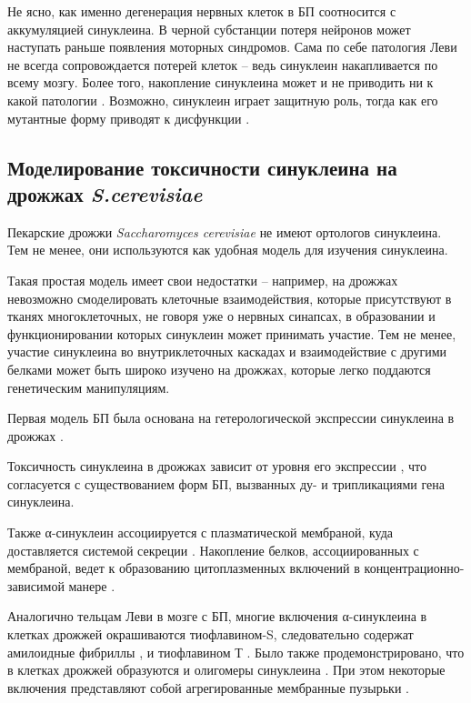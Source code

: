 Не ясно, как именно дегенерация нервных клеток в БП соотносится с аккумуляцией синуклеина.  
В черной субстанции потеря нейронов может наступать раньше появления моторных синдромов. Сама по себе патология Леви не всегда сопровождается потерей клеток -- ведь синуклеин накапливается по всему мозгу. Более того, накопление синуклеина может и не приводить ни к какой патологии \cite{markesbery_lewy_2009}. Возможно, синуклеин играет защитную роль, тогда как его мутантные форму приводят к дисфункции \cite{bendor_function_2013}.



\subsection{Моделирование токсичности синуклеина на дрожжах \emph{S.cerevisiae}}

Пекарские дрожжи \emph{Saccharomyces cerevisiae} не имеют ортологов синуклеина. Тем не менее, они используются как удобная модель для изучения синуклеина.

Такая простая модель имеет свои недостатки -- например, на дрожжах невозможно смоделировать клеточные взаимодействия, которые присутствуют в тканях многоклеточных, не говоря уже о нервных синапсах, в образовании и функционировании которых синуклеин может принимать участие. Тем не менее, участие синуклеина во внутриклеточных каскадах и взаимодействие с другими белками может быть широко изучено на дрожжах, которые легко поддаются генетическим манипуляциям.

Первая модель БП была основана на гетерологической экспрессии синуклеина в дрожжах \cite{outeiro_yeast_2003}.

Токсичность синуклеина в дрожжах зависит от уровня его экспрессии \cite{outeiro_yeast_2003}, что согласуется с существованием форм БП, вызванных ду- и трипликациями гена синуклеина.

Также α-синуклеин ассоциируется с плазматической мембраной, куда доставляется системой секреции \cite{dixon_-synuclein_2005}. Накопление белков, ассоциированных с мембраной, ведет к образованию цитоплазменных включений в концентрационно-зависимой манере \cite{dixon_-synuclein_2005}. 

Аналогично тельцам Леви в мозге с БП, многие включения α-синуклеина в клетках дрожжей окрашиваются тиофлавином-S, следовательно содержат амилоидные фибриллы \cite{zabrocki_phosphorylation_2008}, и тиофлавином Т \cite{oien_clearance_2009}. Было также продемонстрировано, что в клетках дрожжей образуются и олигомеры синуклеина \cite{tenreiro_phosphorylation_2014}.
При этом некоторые включения представляют собой агрегированные мембранные пузырьки \cite{soper_-synucleininduced_2008}.

